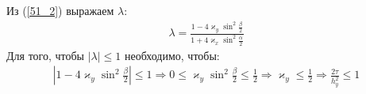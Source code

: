 \documentclass[__main__.tex]{subfiles}
\begin{document}
Из (\ref{51_2}) выражаем $\lambda$:
\begin{gather*}
	\lambda = \frac{1-4\varkappa_y\sin^2\frac{\beta}{2}}{1+4\varkappa_x\sin^2\frac{\alpha}{2}}
\end{gather*}
Для того, чтобы $|\lambda| \leq 1$ необходимо, чтобы:
\begin{gather*}
	\left|1-4\varkappa_y\sin^2\frac{\beta}{2}\right|\leq 1 \Rightarrow 0\leq \varkappa_y \sin^2\frac{\beta}{2} \leq \frac{1}{2} \Rightarrow \varkappa_y \leq \frac{1}{2} \Rightarrow \frac{2\tau}{h^2_y} \leq 1
\end{gather*}
\end{document}
